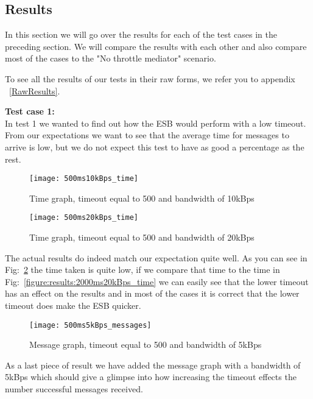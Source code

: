 \subsection{Results}\label{Testing:Results}
	In this section we will go over the results for each of the test cases in the preceding section. We will compare the results with each other and also compare most of the cases to the "No throttle mediator" scenario.
	
	\begin{shaded}
	To see all the results of our tests in their raw forms, we refer you to appendix ~\ref{RawResults}.
	\end{shaded}
	 
    \textbf{Test case 1:}\\
    In test 1 we wanted to find out how the ESB would perform with a low timeout. From our expectations we want to see that the average time for messages to arrive is low, but we do not expect this test to have as good a percentage as the rest. 
    
	\begin{figure}[H]
		\centering
		\texttt{[image: 500ms10kBps\_time]}
		\caption{Time graph, timeout equal to 500 and bandwidth of 10kBps} 
		\label{figure:results:500ms10kBps_time}
	\end{figure}
	
	\begin{figure}[H]
		\centering
		\texttt{[image: 500ms20kBps\_time]}
		\caption{Time graph, timeout equal to 500 and bandwidth of 20kBps} 
		\label{figure:results:500ms20kBps_time}
	\end{figure}
    
    The actual results do indeed match our expectation quite well. As you can see in Fig:~\ref{figure:results:500ms20kBps_time} the time taken is quite low, if we compare that time to the time in Fig:~\ref{figure:results:2000ms20kBps_time} we can easily see that the lower timeout has an effect on the results and in most of the cases it is correct that the lower timeout does make the ESB quicker.
    
    \begin{figure}[H]
		\centering
		\texttt{[image: 500ms5kBps\_messages]}
		\caption{Message graph, timeout equal to 500 and bandwidth of 5kBps} 
		\label{figure:results:500ms5kBps_messages}
	\end{figure}
	
	As a last piece of result we have added the message graph with a bandwidth of 5kBps which should give a glimpse into how increasing the timeout effects the number successful messages received.
    
